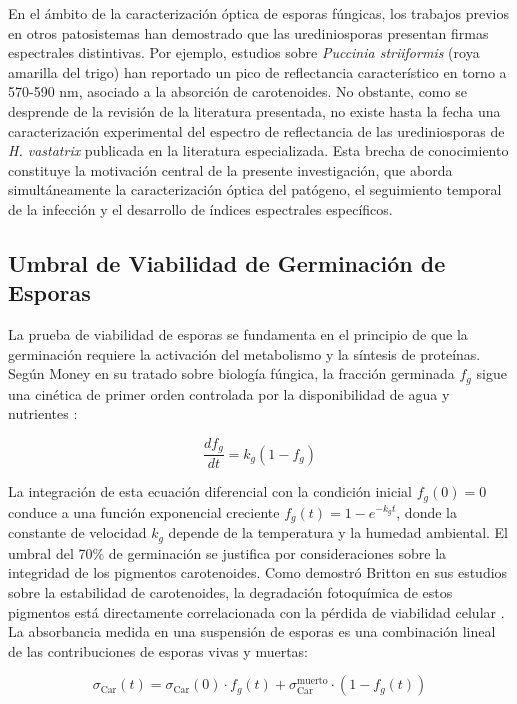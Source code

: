 \documentclass[12pt, a4paper]{article}
\begin{document}
	En el ámbito de la caracterización óptica de esporas fúngicas, los trabajos previos en otros patosistemas han demostrado que las urediniosporas presentan firmas espectrales distintivas. Por ejemplo, estudios sobre \textit{Puccinia striiformis} (roya amarilla del trigo) han reportado un pico de reflectancia característico en torno a 570-590 nm, asociado a la absorción de carotenoides. No obstante, como se desprende de la revisión de la literatura presentada, no existe hasta la fecha una caracterización experimental del espectro de reflectancia de las urediniosporas de \textit{H. vastatrix} publicada en la literatura especializada. Esta brecha de conocimiento constituye la motivación central de la presente investigación, que aborda simultáneamente la caracterización óptica del patógeno, el seguimiento temporal de la infección y el desarrollo de índices espectrales específicos.
	
	\subsection{Umbral de Viabilidad de Germinación de Esporas}
	
	La prueba de viabilidad de esporas se fundamenta en el principio de que la germinación requiere la activación del metabolismo y la síntesis de proteínas. Según Money en su tratado sobre biología fúngica, la fracción germinada $f_g$ sigue una cinética de primer orden controlada por la disponibilidad de agua y nutrientes \parencite{Money2016}:
	
	\begin{equation}
		\frac{df_g}{dt} = k_g (1 - f_g)
		\label{eq:cinetica_germinacion}
	\end{equation}
	
	La integración de esta ecuación diferencial con la condición inicial $f_g(0) = 0$ conduce a una función exponencial creciente $f_g(t) = 1 - e^{-k_g t}$, donde la constante de velocidad $k_g$ depende de la temperatura y la humedad ambiental. El umbral del 70\% de germinación se justifica por consideraciones sobre la integridad de los pigmentos carotenoides. Como demostró Britton en sus estudios sobre la estabilidad de carotenoides, la degradación fotoquímica de estos pigmentos está directamente correlacionada con la pérdida de viabilidad celular \parencite{Britton1995}. La absorbancia medida en una suspensión de esporas es una combinación lineal de las contribuciones de esporas vivas y muertas:
	
	\begin{equation}
		\sigma_{\text{Car}}(t) = \sigma_{\text{Car}}(0) \cdot f_g(t) + \sigma_{\text{Car}}^{\text{muerto}} \cdot (1 - f_g(t))
		\label{eq:absorcion_viabilidad}
	\end{equation}
	
\end{document}
